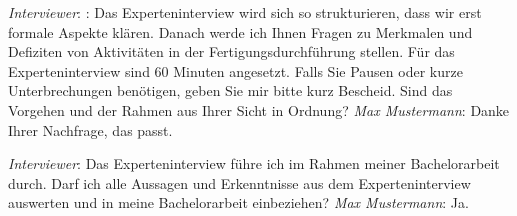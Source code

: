 \textit{Interviewer}: : Das Experteninterview wird sich so strukturieren, dass wir erst formale Aspekte klären. Danach werde ich Ihnen Fragen zu Merkmalen und Defiziten von Aktivitäten in der Fertigungsdurchführung stellen. Für das Experteninterview sind 60 Minuten angesetzt. Falls Sie Pausen oder kurze Unterbrechungen benötigen, geben Sie mir bitte kurz Bescheid. Sind das Vorgehen und der Rahmen aus Ihrer Sicht in Ordnung?
\newline
\textit{Max Mustermann}: Danke Ihrer Nachfrage, das passt.

\textit{Interviewer}: Das Experteninterview führe ich im Rahmen meiner Bachelorarbeit durch. Darf ich alle Aussagen und Erkenntnisse aus dem Experteninterview auswerten und in meine Bachelorarbeit einbeziehen?
\newline
\textit{Max Mustermann}: Ja.


